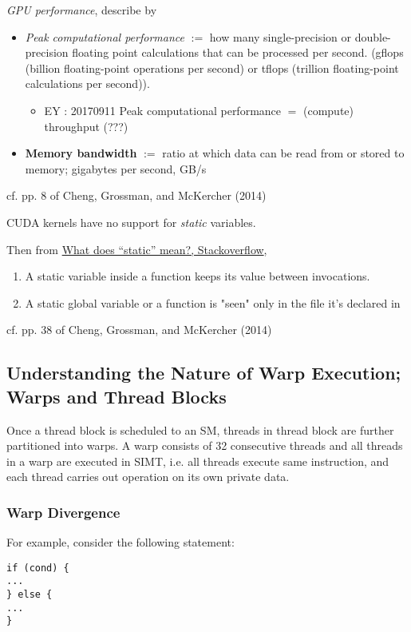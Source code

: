 \documentclass[10pt]{amsart}
\begin{document}
\begin{multicols*}{2}
\emph{GPU performance}, describe by 
\begin{itemize}
	\item \emph{Peak computational performance} $:=$ how many single-precision or double-precision floating point calculations that can be processed per second.  (gflops (billion floating-point operations per second) or tflops (trillion floating-point calculations per second)).  
	\begin{itemize}
		\item EY : 20170911 Peak computational performance $=$ (compute) throughput (???)
	\end{itemize}
	\item \textbf{Memory bandwidth} $:=$ ratio at which data can be read from or stored to memory; gigabytes per second, GB/s
\end{itemize}
cf. pp. 8 of Cheng, Grossman, and McKercher (2014) \cite{CGM2014}

CUDA kernels have no support for \emph{static} variables.  

Then from \href{https://stackoverflow.com/questions/572547/what-does-static-mean}{What does “static” mean?, Stackoverflow}, 

\begin{enumerate}
	\item A static variable inside a function keeps its value between invocations. 
	\item A static global variable or a function is "seen" only in the file it's declared in
\end{enumerate}



cf. pp. 38 of Cheng, Grossman, and McKercher (2014) \cite{CGM2014}



\subsection{Understanding the Nature of Warp Execution; Warps and Thread Blocks}  

Once a thread block is scheduled to an SM, threads in thread block are further partitioned into warps.  A warp consists of 32 consecutive threads and all threads in a warp are executed in SIMT, i.e. all threads execute same instruction, and each thread carries out operation on its own private data.  

\subsubsection{Warp Divergence }
For example, consider the following statement:  
\begin{lstlisting}  
if (cond) {
...   
} else {
...
}
\end{lstlisting}


\end{multicols*}
\end{document}
